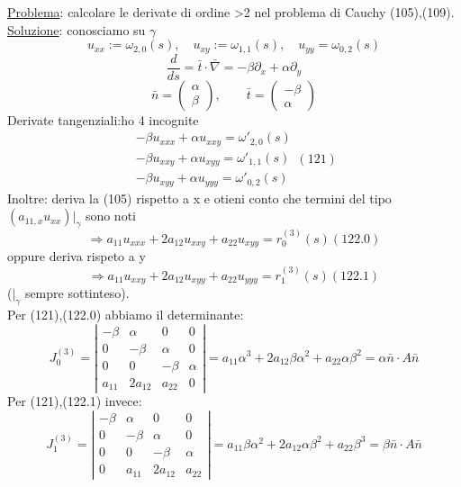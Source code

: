 \documentclass[a4paper,11pt]{report}
\begin{document}
\underline{Problema}: calcolare le derivate di ordine >2 nel problema di Cauchy (105),(109).\\
\underline{Soluzione}: conosciamo su $\gamma$
$$
u_{xx}:=\omega_{2,0}(s), \quad u_{xy}:=\omega_{1,1}(s), \quad u_{yy}=\omega_{0,2}(s)
$$
$$
\dfrac{d}{ds}=\bar{t}\cdot \bar{\nabla} = -\beta \partial_x + \alpha \partial_y
$$
$$
\bar{n}=\left(\begin{matrix}
\alpha \\ \beta
\end{matrix}\right), \qquad \bar{t}=\left(\begin{matrix}
-\beta \\ \alpha
\end{matrix}\right)
$$
Derivate tangenziali:ho 4 incognite
\begin{equation}
\begin{matrix}
-\beta u_{xxx} + \alpha u_{xxy} = \omega'_{2,0}(s) \\
-\beta u_{xxy} + \alpha u_{xyy} = \omega'_{1,1}(s) \\
-\beta u_{xyy} + \alpha u_{yyy} = \omega'_{0,2}(s)
\end{matrix} (121)
\end{equation}
Inoltre: deriva la (105) rispetto a x e otieni conto che termini del tipo $(a_{11,x}u_{xx})|_{\gamma}$ sono noti
\begin{equation}
\Rightarrow a_{11}u_{xxx} + 2a_{12}u_{xxy} + a_{22}u_{xyy}=r_0^{(3)}(s) (122.0)
\end{equation}
oppure deriva rispeto a y
\begin{equation}
\Rightarrow a_{11}u_{xxy} + 2a_{12}u_{xyy} + a_{22}u_{yyy}=r_1^{(3)}(s) (122.1)
\end{equation}
($|_{\gamma}$ sempre sottinteso).\\
Per (121),(122.0) abbiamo il determinante:
$$
J_0^{(3)}=\left|\begin{matrix}
-\beta & \alpha & 0 & 0\\
0 & -\beta & \alpha & 0 \\
0 & 0 & -\beta & \alpha \\
a_{11} & 2a_{12} & a_{22} & 0
\end{matrix}\right| = a_{11}\alpha^3 + 2a_{12}\beta\alpha^2 + a_{22}\alpha\beta^2 = \alpha \bar{n}\cdot A \bar{n}
$$
Per (121),(122.1) invece: 
$$
J_1^{(3)}=\left|\begin{matrix}
-\beta & \alpha & 0 & 0\\
0 & -\beta & \alpha & 0 \\
0 & 0 & -\beta & \alpha \\
0 & a_{11} & 2a_{12} & a_{22} 
\end{matrix}\right| = a_{11}\beta\alpha^2 + 2a_{12}\alpha\beta^2 + a_{22}\beta^3 = \beta \bar{n}\cdot A \bar{n}
$$
\end{document}
